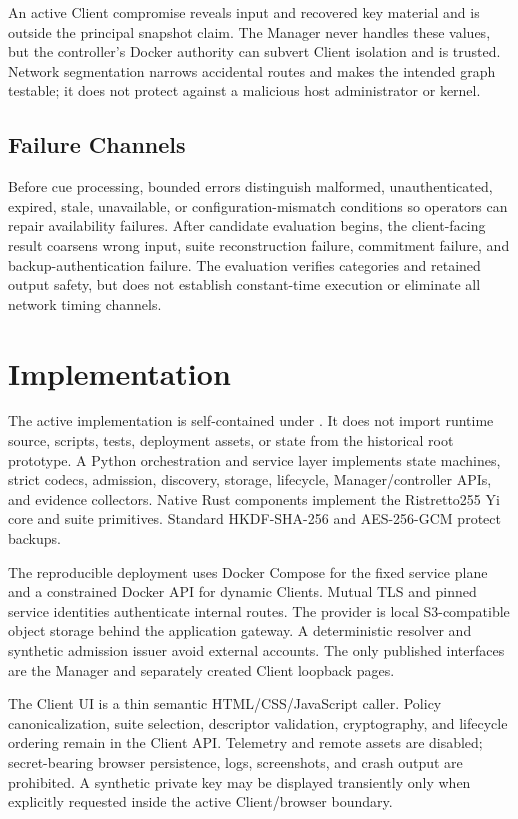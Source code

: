 \documentclass[sigconf,anonymous]{acmart}
\begin{document}
An active Client compromise reveals input and recovered key material and is
outside the principal snapshot claim. The Manager never handles these values,
but the controller's Docker authority can subvert Client isolation and is
trusted. Network segmentation narrows accidental routes and makes the intended
graph testable; it does not protect against a malicious host administrator or
kernel.

\subsection{Failure Channels}

Before cue processing, bounded errors distinguish malformed, unauthenticated,
expired, stale, unavailable, or configuration-mismatch conditions so operators
can repair availability failures. After candidate evaluation begins, the
client-facing result coarsens wrong input, suite reconstruction failure,
commitment failure, and backup-authentication failure. The evaluation verifies
categories and retained output safety, but does not establish constant-time
execution or eliminate all network timing channels.

\section{Implementation}
\label{sec:implementation}

The active implementation is self-contained under .
It does not import runtime source, scripts, tests, deployment assets, or state
from the historical root prototype. A Python orchestration and service layer
implements state machines, strict codecs, admission, discovery, storage,
lifecycle, Manager/controller APIs, and evidence collectors. Native Rust
components implement the Ristretto255 Yi core and suite primitives. Standard
HKDF-SHA-256 and AES-256-GCM protect backups.

The reproducible deployment uses Docker Compose for the fixed service plane
and a constrained Docker API for dynamic Clients. Mutual TLS and pinned
service identities authenticate internal routes. The provider is local
S3-compatible object storage behind the application gateway. A deterministic
resolver and synthetic admission issuer avoid external accounts. The only
published interfaces are the Manager and separately created Client loopback
pages.

The Client UI is a thin semantic HTML/CSS/JavaScript caller. Policy
canonicalization, suite selection, descriptor validation, cryptography, and
lifecycle ordering remain in the Client API. Telemetry and remote assets are
disabled; secret-bearing browser persistence, logs, screenshots, and crash
output are prohibited. A synthetic private key may be displayed transiently
only when explicitly requested inside the active Client/browser boundary.
\end{document}
